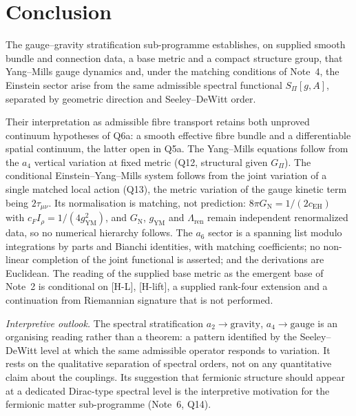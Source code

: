 \documentclass[11pt,a4paper]{article}
\theoremstyle{definition}
\newcommand{\GN}{G_{\mathrm{N}}}
\newcommand{\gYM}{g_{\mathrm{YM}}}
\newcommand{\cEH}{c_{\mathrm{EH}}}
\newcommand{\cF}{c_{F}}
\newcommand{\Irho}{I_\rho}
\newcommand{\SPI}{S_\Pi}
\newcommand{\Gpi}{G_\Pi}
\begin{document}
  \section{Conclusion}
    \label{sec:conclusion}

    The gauge--gravity stratification sub-programme establishes, on supplied smooth bundle and connection data, a base metric and a compact
    structure group, that Yang--Mills gauge dynamics and, under the matching conditions of Note~4, the Einstein
    sector arise from the same admissible spectral functional $\SPI[g,A]$, separated by geometric direction and
    Seeley--DeWitt order.

    Their interpretation as admissible fibre transport retains both unproved continuum hypotheses
    of Q6a: a smooth effective fibre bundle and a differentiable spatial continuum, the latter open in Q5a.
    The Yang--Mills equations follow from the $a_4$ vertical variation at fixed metric (Q12,
    structural given $\Gpi$).
    The conditional Einstein--Yang--Mills system follows from the joint variation of a single
    matched local action (Q13), the metric variation of the gauge kinetic term being
    $2\tau_{\mu\nu}$.
    Its normalisation is matching, not prediction: $8\pi\GN = 1/(2\cEH)$ with
    $\cF\Irho = 1/(4\gYM^2)$, and $\GN$, $\gYM$ and $\Lambda_{\mathrm{ren}}$ remain independent
    renormalized data, so no numerical hierarchy follows.
    The $a_6$ sector is a spanning list modulo integrations by parts and Bianchi identities, with
    matching coefficients; no non-linear completion of the joint functional is asserted; and the
    derivations are Euclidean.
    The reading of the supplied base metric as the emergent base of Note~2 is conditional on [H-L], [H-lift], a
    supplied rank-four extension and a continuation from Riemannian signature that is not performed.

    \emph{Interpretive outlook.} The spectral stratification $a_2 \to \text{gravity}$,
    $a_4 \to \text{gauge}$ is an organising reading rather than a theorem: a pattern
    identified by the Seeley--DeWitt level at which the same admissible operator responds to
    variation. It rests on the qualitative separation of spectral orders, not on any quantitative
    claim about the couplings.
    Its suggestion that fermionic structure should appear at a dedicated Dirac-type
    spectral level is the interpretive motivation for the fermionic matter sub-programme
    (Note~6, Q14).

    \newpage
    
    
\end{document}
